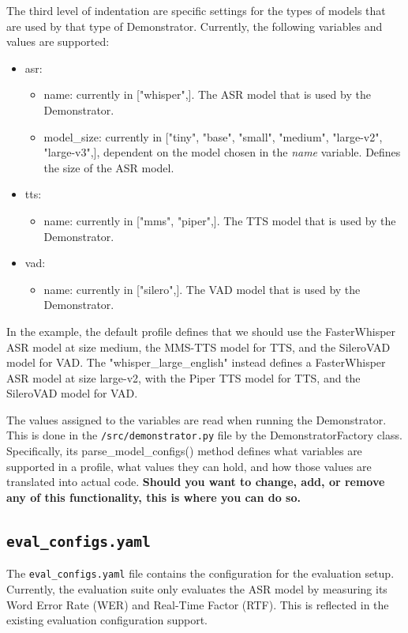 The third level of indentation are specific settings for the types of models that are used by that type of Demonstrator.
Currently, the following variables and values are supported:
\begin{itemize}
    \item asr: 
    \begin{itemize}
        \item name: currently in ["whisper",]. The ASR model that is used by the Demonstrator.
        \item model\_size: currently in ["tiny", "base", "small", "medium", "large-v2", "large-v3",], dependent on the model chosen in the \textit{name} variable. Defines the size of the ASR model.
    \end{itemize}
    \item tts:
    \begin{itemize}
        \item name: currently in ["mms", "piper",]. The TTS model that is used by the Demonstrator.
    \end{itemize}
    \item vad:
    \begin{itemize}
        \item name: currently in ["silero",]. The VAD model that is used by the Demonstrator.
    \end{itemize}
\end{itemize}
In the example, the default profile defines that we should use the FasterWhisper ASR model at size medium, the MMS-TTS model for TTS, and the SileroVAD model for VAD. The "whisper\_large\_english" instead defines a FasterWhisper ASR model at size large-v2, with the Piper TTS model for TTS, and the SileroVAD model for VAD.

The values assigned to the variables are read when running the Demonstrator.
This is done in the \texttt{/src/demonstrator.py} file by the DemonstratorFactory class.
Specifically, its parse\_model\_configs() method defines what variables are supported in a profile, what values they can hold, and how those values are translated into actual code.
\textbf{Should you want to change, add, or remove any of this functionality, this is where you can do so.}

\subsection{\texttt{eval\_configs.yaml}}
The \texttt{eval\_configs.yaml} file contains the configuration for the evaluation setup.
Currently, the evaluation suite only evaluates the ASR model by measuring its Word Error Rate (WER) and Real-Time Factor (RTF).
This is reflected in the existing evaluation configuration support.

